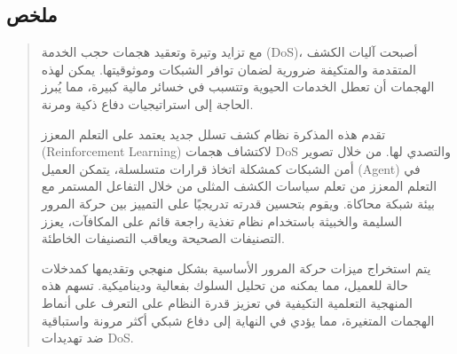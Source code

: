 \documentclass[12pt]{report}
\begin{document}
\newpage
\begin{otherlanguage}{arabic}
\chapter*{ملخص}

\begin{quote}
\large
مع تزايد وتيرة وتعقيد هجمات حجب الخدمة (DoS)، أصبحت آليات الكشف المتقدمة والمتكيفة ضرورية لضمان توافر الشبكات وموثوقيتها. يمكن لهذه الهجمات أن تعطل الخدمات الحيوية وتتسبب في خسائر مالية كبيرة، مما يُبرز الحاجة إلى استراتيجيات دفاع ذكية ومرنة.

تقدم هذه المذكرة نظام كشف تسلل جديد يعتمد على التعلم المعزز (Reinforcement Learning) لاكتشاف هجمات DoS والتصدي لها. من خلال تصوير أمن الشبكات كمشكلة اتخاذ قرارات متسلسلة، يتمكن العميل (Agent) في التعلم المعزز من تعلم سياسات الكشف المثلى من خلال التفاعل المستمر مع بيئة شبكة محاكاة. ويقوم بتحسين قدرته تدريجيًا على التمييز بين حركة المرور السليمة والخبيثة باستخدام نظام تغذية راجعة قائم على المكافآت، يعزز التصنيفات الصحيحة ويعاقب التصنيفات الخاطئة.

يتم استخراج ميزات حركة المرور الأساسية بشكل منهجي وتقديمها كمدخلات حالة للعميل، مما يمكنه من تحليل السلوك بفعالية وديناميكية. تسهم هذه المنهجية التعلمية التكيفية في تعزيز قدرة النظام على التعرف على أنماط الهجمات المتغيرة، مما يؤدي في النهاية إلى دفاع شبكي أكثر مرونة واستباقية ضد تهديدات DoS.
\end{quote}

\vspace{1em}
\end{otherlanguage}
\end{document}

